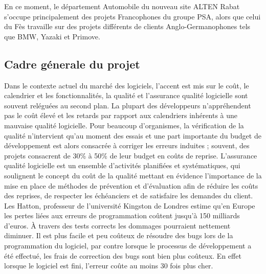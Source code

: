 En ce moment, le département Automobile du nouveau site ALTEN Rabat s’occupe principalement des projets Francophones du groupe PSA, alors que celui du Fès travaille sur des projets différents de clients Anglo-Germanophones tels que BMW, Yazaki et Primove.

\subsection{Cadre génerale du projet}
Dans le contexte actuel du marché des logiciels, l’accent est mis sur le coût, le calendrier et les fonctionnalités, la qualité et l’assurance qualité logicielle sont souvent reléguées au second plan. La plupart des développeurs n’appréhendent pas le coût élevé et les retards par rapport aux calendriers inhérents à une mauvaise qualité logicielle. Pour beaucoup d’organismes, la vérification de la qualité n’intervient qu’au moment des essais et une part importante du budget de développement est alors consacrée à corriger les erreurs induites ; souvent, des projets consacrent de 30\% à 50\% de leur budget en coûts de reprise. L’assurance qualité logicielle est un ensemble d'activités planifiées et systématiques, qui soulignent le concept du coût de la qualité mettant en évidence l’importance de la mise en place de méthodes de prévention et d’évaluation afin de réduire les coûts des reprises, de respecter les échéanciers et de satisfaire les demandes du client.\\
Les Hatton, professeur de l’université Kingston de Londres estime qu’en Europe les pertes liées aux erreurs de programmation coûtent jusqu’à 150 milliards d’euros. À travers des tests corrects les dommages pourraient nettement diminuer. Il est plus facile et peu coûteux de résoudre des bugs lors de la programmation du logiciel, par contre lorsque le processus de développement a été effectué, les frais de correction des bugs sont bien plus coûteux. En effet lorsque le logiciel est fini, l’erreur coûte au moins 30 fois plus cher. 


